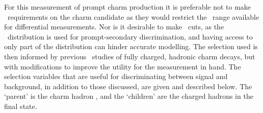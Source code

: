 For this measurement of prompt charm production it is preferable not to make 
\pT\ requirements on the charm candidate as they would restrict the \pT\ range 
available for differential measurements.
Nor is it desirable to make \ipchisq\ cuts, as the \ipchisq\ distribution is 
used for prompt-secondary discrimination, and having access to only part of the 
distribution can hinder accurate modelling.
The selection used is then informed by previous \lhcb\ studies of fully 
charged, hadronic charm decays, but with modifications to improve the utility 
for the measurement in hand.
The selection variables that are useful for discriminating between signal and 
background, in addition to those discussed, are given and described below.
The `parent' is the charm hadron \PHc, and the `children' are the charged 
hadrons in the final state.

